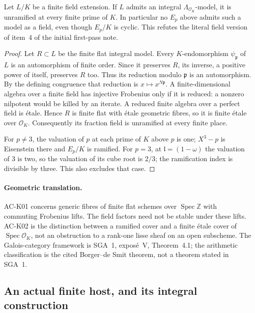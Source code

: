 \begin{proposition}
\label{AC-K02}
Let $L/K$ be a finite field extension. If $L$ admits an integral
$\Lambda_{\mathcal O_K}$-model, it is unramified at every finite
prime of $K$. In particular no $E_p$ above admits such a model as
a field, even though $E_p/K$ is cyclic. This refutes the literal
field version of item~4 of the initial first-pass note.
\end{proposition}
\begin{proof}
Let $R\subset L$ be the finite flat integral model. Every
$K$-endomorphism $\psi_{\mathfrak p}$ of $L$ is an automorphism
of finite order. Since it preserves $R$, its inverse, a positive
power of itself, preserves $R$ too. Thus its reduction modulo
$\mathfrak p$ is an automorphism. By the defining congruence that
reduction is $x\mapsto x^{N\mathfrak p}$. A finite-dimensional
algebra over a finite field has injective Frobenius only if it
is reduced: a nonzero nilpotent would be killed by an iterate.
A reduced finite algebra over a perfect field is \'etale.
Hence $R$ is finite flat with \'etale geometric fibres, so it is
finite \'etale over $\mathcal O_K$. Consequently its fraction
field is unramified at every finite place.

For $p\ne3$, the valuation of $p$ at each prime of $K$ above $p$
is one; $X^3-p$ is Eisenstein there and $E_p/K$ is ramified.
For $p=3$, at $\mathfrak l=(1-\omega)$ the valuation of $3$ is
two, so the valuation of its cube root is $2/3$; the ramification
index is divisible by three. This also excludes that case.
\end{proof}

\paragraph{Geometric translation.}
AC-K01 concerns generic fibres of finite flat schemes over
$\operatorname{Spec}\mathbb Z$ with commuting Frobenius lifts.
The field factors need not be stable under these lifts.
AC-K02 is the distinction between a ramified cover and a finite
\'etale cover of $\operatorname{Spec}\mathcal O_K$, not an
obstruction to a rank-one lisse sheaf on an open subscheme.
The Galois-category framework is SGA~1, expos\'e~V, Theorem~4.1;
the arithmetic classification is the cited Borger--de Smit theorem,
not a theorem stated in SGA~1.

\subsection{An actual finite host, and its integral construction}

